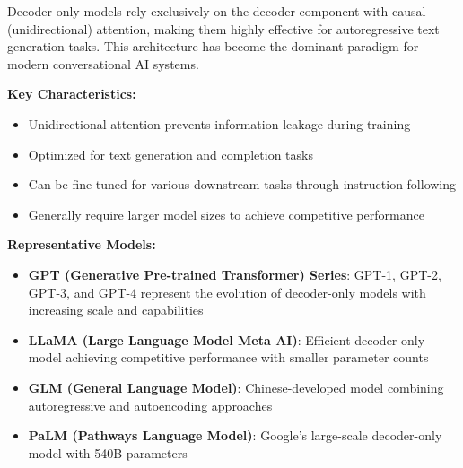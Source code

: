 \documentclass[12pt,a4paper]{article}
\begin{document}

Decoder-only models rely exclusively on the decoder component with causal (unidirectional) attention, making them highly effective for autoregressive text generation tasks. This architecture has become the dominant paradigm for modern conversational AI systems.

\textbf{Key Characteristics:}
\begin{itemize}
    \item Unidirectional attention prevents information leakage during training
    \item Optimized for text generation and completion tasks
    \item Can be fine-tuned for various downstream tasks through instruction following
    \item Generally require larger model sizes to achieve competitive performance
\end{itemize}

\textbf{Representative Models:}
\begin{itemize}
    \item \textbf{GPT (Generative Pre-trained Transformer) Series}: GPT-1, GPT-2, GPT-3, and GPT-4 represent the evolution of decoder-only models with increasing scale and capabilities
    \item \textbf{LLaMA (Large Language Model Meta AI)}: Efficient decoder-only model achieving competitive performance with smaller parameter counts
    \item \textbf{GLM (General Language Model)}: Chinese-developed model combining autoregressive and autoencoding approaches
    \item \textbf{PaLM (Pathways Language Model)}: Google's large-scale decoder-only model with 540B parameters
\end{itemize}
\end{document}
